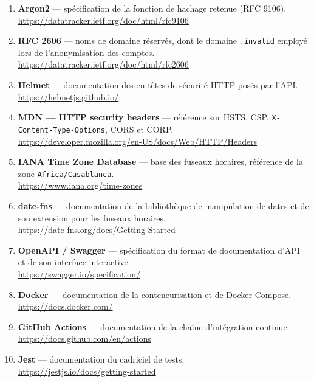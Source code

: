 \begin{enumerate}[leftmargin=1.1cm,itemsep=6pt]
  \item \textbf{Argon2} --- spécification de la fonction de hachage retenue
  (RFC 9106).
  \\ \url{https://datatracker.ietf.org/doc/html/rfc9106}

  \item \textbf{RFC 2606} --- noms de domaine réservés, dont le domaine
  \texttt{.invalid} employé lors de l'anonymisation des comptes.
  \\ \url{https://datatracker.ietf.org/doc/html/rfc2606}

  \item \textbf{Helmet} --- documentation des en-têtes de sécurité HTTP posés
  par l'API.
  \\ \url{https://helmetjs.github.io/}

  \item \textbf{MDN --- HTTP security headers} --- référence sur HSTS, CSP,
  \texttt{X-Content-\allowbreak Type-Options}, CORS et CORP.
  \\ \url{https://developer.mozilla.org/en-US/docs/Web/HTTP/Headers}

  \item \textbf{IANA Time Zone Database} --- base des fuseaux horaires,
  référence de la zone \texttt{Africa/Casablanca}.
  \\ \url{https://www.iana.org/time-zones}

  \item \textbf{date-fns} --- documentation de la bibliothèque de manipulation
  de dates et de son extension pour les fuseaux horaires.
  \\ \url{https://date-fns.org/docs/Getting-Started}

  \item \textbf{OpenAPI / Swagger} --- spécification du format de documentation
  d'API et de son interface interactive.
  \\ \url{https://swagger.io/specification/}

  \item \textbf{Docker} --- documentation de la conteneurisation et de Docker
  Compose.
  \\ \url{https://docs.docker.com/}

  \item \textbf{GitHub Actions} --- documentation de la chaîne d'intégration
  continue.
  \\ \url{https://docs.github.com/en/actions}

  \item \textbf{Jest} --- documentation du cadriciel de tests.
  \\ \url{https://jestjs.io/docs/getting-started}


\end{enumerate}
